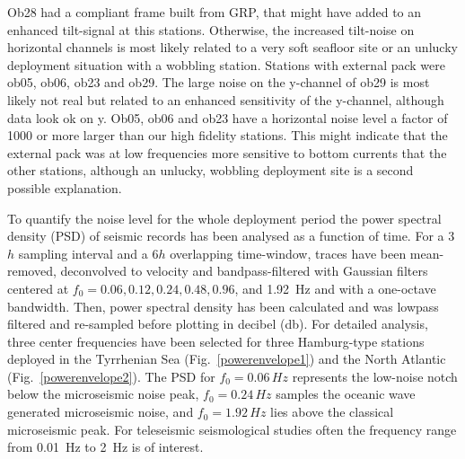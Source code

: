\documentclass{article}
\begin{document}
{Ob28 had a compliant frame built from GRP, that might have added to
an enhanced tilt-signal at this stations.
Otherwise, the increased tilt-noise on horizontal channels 
is most likely related to a very soft seafloor site or 
an unlucky deployment situation with a wobbling station.
Stations with external pack were ob05, ob06, ob23 and ob29.
The large noise on the y-channel of ob29 is most likely not real but 
related to an enhanced sensitivity of the y-channel, 
although data look ok on y.
Ob05, ob06 and ob23 have a horizontal noise level a factor 
of 1000 or more larger than our high fidelity stations.
This might indicate that the external pack was at low frequencies 
more sensitive to bottom currents that the other stations, 
although an unlucky, wobbling deployment site is a second 
possible explanation.

To quantify the noise level for the whole deployment period
the power spectral density (PSD) of seismic records has been analysed
as a function of time.
For a 3$h$ sampling interval and a 6$h$ overlapping time-window,
traces have been mean-removed, deconvolved to velocity 
and bandpass-filtered 
with Gaussian filters centered at $f_0=0.06, 0.12, 0.24, 0.48,
0.96$, and 1.92~Hz
and with  a one-octave bandwidth.
Then, power spectral  density has been calculated and  was 
lowpass filtered and re-sampled before plotting 
in decibel (db).
For detailed analysis, three 
center frequencies have been selected for three Hamburg-type stations deployed in 
the 
Tyrrhenian Sea (Fig.~\ref{powerenvelope1})
and the
North Atlantic (Fig.~\ref{powerenvelope2}).
The PSD for $f_0 = 0.06\, Hz$ represents the low-noise notch
below the microseismic noise peak, 
$f_0 = 0.24\, Hz$ samples the oceanic wave generated microseismic noise, 
and 
$f_0 = 1.92\, Hz$ lies above the classical microseismic peak.
For teleseismic seismological studies often 
the frequency range 
from 0.01~Hz to 2~Hz is of interest.

}
\end{document}
